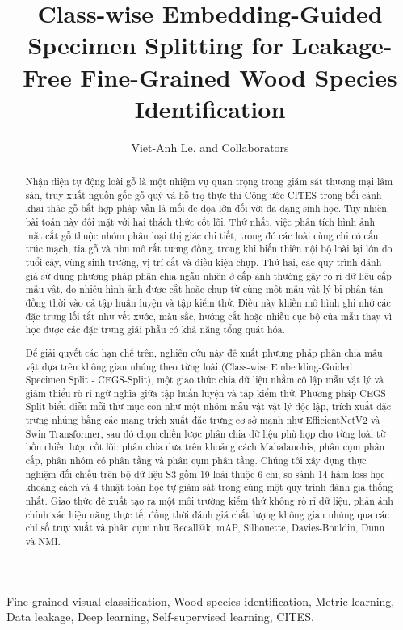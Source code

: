 \documentclass[journal,twocolumn]{IEEEtran}
\begin{document}
\title{Class-wise Embedding-Guided Specimen Splitting for Leakage-Free Fine-Grained Wood Species Identification}

\author{Viet-Anh Le, and Collaborators}

\maketitle

\begin{abstract}
Nhận diện tự động loài gỗ là một nhiệm vụ quan trọng trong giám sát thương mại lâm sản, truy xuất nguồn gốc gỗ quý và hỗ trợ thực thi Công ước CITES trong bối cảnh khai thác gỗ bất hợp pháp vẫn là mối đe dọa lớn đối với đa dạng sinh học. Tuy nhiên, bài toán này đối mặt với hai thách thức cốt lõi. Thứ nhất, việc phân tích hình ảnh mặt cắt gỗ thuộc nhóm phân loại thị giác chi tiết, trong đó các loài cùng chi có cấu trúc mạch, tia gỗ và nhu mô rất tương đồng, trong khi biến thiên nội bộ loài lại lớn do tuổi cây, vùng sinh trưởng, vị trí cắt và điều kiện chụp. Thứ hai, các quy trình đánh giá sử dụng phương pháp phân chia ngẫu nhiên ở cấp ảnh thường gây rò rỉ dữ liệu cấp mẫu vật, do nhiều hình ảnh được cắt hoặc chụp từ cùng một mẫu vật lý bị phân tán đồng thời vào cả tập huấn luyện và tập kiểm thử. Điều này khiến mô hình ghi nhớ các đặc trưng lối tắt như vết xước, màu sắc, hướng cắt hoặc nhiễu cục bộ của mẫu thay vì học được các đặc trưng giải phẫu có khả năng tổng quát hóa.

Để giải quyết các hạn chế trên, nghiên cứu này đề xuất phương pháp phân chia mẫu vật dựa trên không gian nhúng theo từng loài (Class-wise Embedding-Guided Specimen Split - CEGS-Split), một giao thức chia dữ liệu nhằm cô lập mẫu vật lý và giảm thiểu rò rỉ ngữ nghĩa giữa tập huấn luyện và tập kiểm thử. Phương pháp CEGS-Split biểu diễn mỗi thư mục con như một nhóm mẫu vật vật lý độc lập, trích xuất đặc trưng nhúng bằng các mạng trích xuất đặc trưng cơ sở mạnh như EfficientNetV2 và Swin Transformer, sau đó chọn chiến lược phân chia dữ liệu phù hợp cho từng loài từ bốn chiến lược cốt lõi: phân chia dựa trên khoảng cách Mahalanobis, phân cụm phân cấp, phân nhóm có phân tầng và phân cụm phân tầng. Chúng tôi xây dựng thực nghiệm đối chiếu trên bộ dữ liệu S3 gồm 19 loài thuộc 6 chi, so sánh 14 hàm loss học khoảng cách và 4 thuật toán học tự giám sát trong cùng một quy trình đánh giá thống nhất. Giao thức đề xuất tạo ra một môi trường kiểm thử không rò rỉ dữ liệu, phản ánh chính xác hiệu năng thực tế, đồng thời đánh giá chất lượng không gian nhúng qua các chỉ số truy xuất và phân cụm như Recall@k, mAP, Silhouette, Davies-Bouldin, Dunn và NMI.
\end{abstract}

\begin{IEEEkeywords}
Fine-grained visual classification, Wood species identification, Metric learning, Data leakage, Deep learning, Self-supervised learning, CITES.
\end{IEEEkeywords}









\end{document}
